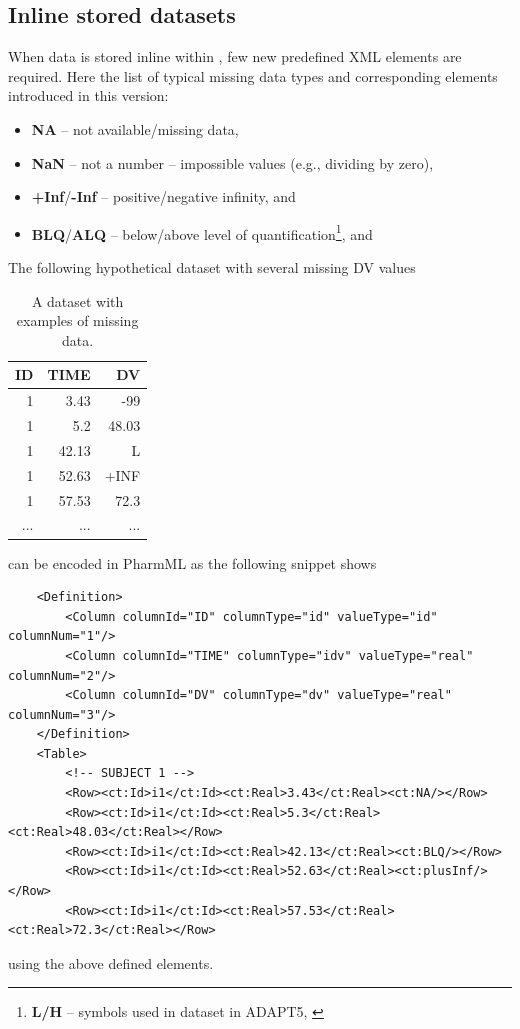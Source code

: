 \subsection{Inline stored datasets}
When data is stored inline within \pml, few new predefined XML elements are required. Here the 
list of typical missing data types and corresponding elements introduced in this version:
\begin{itemize}
\item
\textbf{NA} -- not available/missing data, 
\item
\textbf{NaN} -- not a number -- impossible values (e.g., dividing by zero), 
\item
\textbf{+Inf}/\textbf{-Inf}  -- positive/negative infinity,  and 
\item
\textbf{BLQ}/\textbf{ALQ} -- below/above level of quantification\footnote{\textbf{L/H} -- symbols used in dataset in ADAPT5, \cite{DArgenio:2009aa}},  and 
\end{itemize}
The following hypothetical dataset with several missing DV values
\begin{table}[htdp]
\begin{center}
\small
\renewcommand{\arraystretch}{1.1}%
\begin{tabular}{rrr}
\hline
ID 	& TIME	& DV	 \\ 
\hline
1 	& 3.43 		& -99 	\\ 
1 	& 5.2 		& 48.03 	 \\ 
1 	& 42.13 		& L	 \\ 
1 	& 52.63 		& +INF 	 \\ 
1 	& 57.53 		& 72.3  \\ 
...	& ...		& ...	\\ 
\hline
\end{tabular}
\end{center}
\vspace{-1em}\caption{A dataset with examples of missing data.}
\label{tab:uslessDataSet}
\end{table}%

can be encoded in PharmML as the following snippet shows
\lstset{language=XML}
\begin{lstlisting}
    <Definition>
        <Column columnId="ID" columnType="id" valueType="id" columnNum="1"/>
        <Column columnId="TIME" columnType="idv" valueType="real" columnNum="2"/>
        <Column columnId="DV" columnType="dv" valueType="real" columnNum="3"/>
    </Definition>
    <Table>
        <!-- SUBJECT 1 -->
        <Row><ct:Id>i1</ct:Id><ct:Real>3.43</ct:Real><ct:NA/></Row>
        <Row><ct:Id>i1</ct:Id><ct:Real>5.3</ct:Real><ct:Real>48.03</ct:Real></Row> 
        <Row><ct:Id>i1</ct:Id><ct:Real>42.13</ct:Real><ct:BLQ/></Row>
        <Row><ct:Id>i1</ct:Id><ct:Real>52.63</ct:Real><ct:plusInf/></Row>
        <Row><ct:Id>i1</ct:Id><ct:Real>57.53</ct:Real><ct:Real>72.3</ct:Real></Row>
\end{lstlisting}
using the above defined elements.


